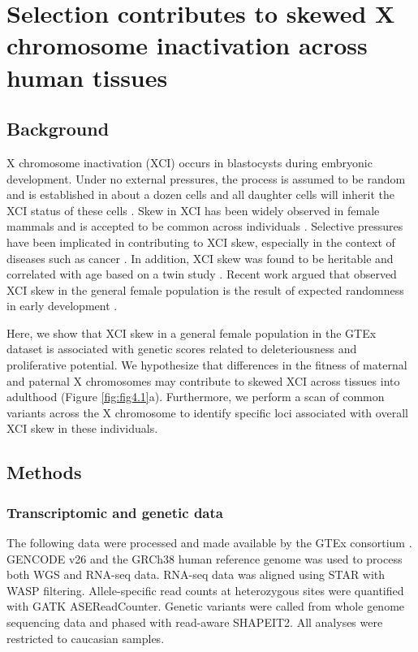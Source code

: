 \chapter{Selection contributes to skewed X chromosome inactivation across human tissues}

\section{Background}
X chromosome inactivation (XCI) occurs in blastocysts during embryonic development. Under no external pressures, the process is assumed to be random and is established in about a dozen cells and all daughter cells will inherit the XCI status of these cells \cite{Takagi1975-es}. Skew in XCI has been widely observed in female mammals and is accepted to be common across individuals \cite{Shvetsova2019-re}. Selective pressures have been implicated in contributing to XCI skew, especially in the context of diseases such as cancer \cite{Brown1999-dc,Migeon1998-gc}. In addition, XCI skew was found to be heritable and correlated with age based on a twin study \cite{Zito2019-hu}. Recent work argued that observed XCI skew in the general female population is the result of expected randomness in early development \cite{Shvetsova2019-re}. 

Here, we show that XCI skew in a general female population in the GTEx dataset \cite{GTEx_Consortium2020-xx} is associated with genetic scores related to deleteriousness and proliferative potential. We hypothesize that differences in the fitness of maternal and paternal X chromosomes may contribute to skewed XCI across tissues into adulthood (Figure \ref{fig:fig4.1}a).  Furthermore, we perform a scan of common variants across the X chromosome to identify specific loci associated with overall XCI skew in these individuals.



\section{Methods}
\subsection{Transcriptomic and genetic data}

The following data were processed and made available by the GTEx consortium \cite{GTEx_Consortium2020-xx}. GENCODE v26 and the GRCh38 human reference genome was used to process both WGS and RNA-seq data. RNA-seq data was aligned using STAR with WASP filtering. Allele-specific read counts at heterozygous sites were quantified with GATK ASEReadCounter. Genetic variants were called from whole genome sequencing data and phased with read-aware SHAPEIT2. All analyses were restricted to caucasian samples. 

